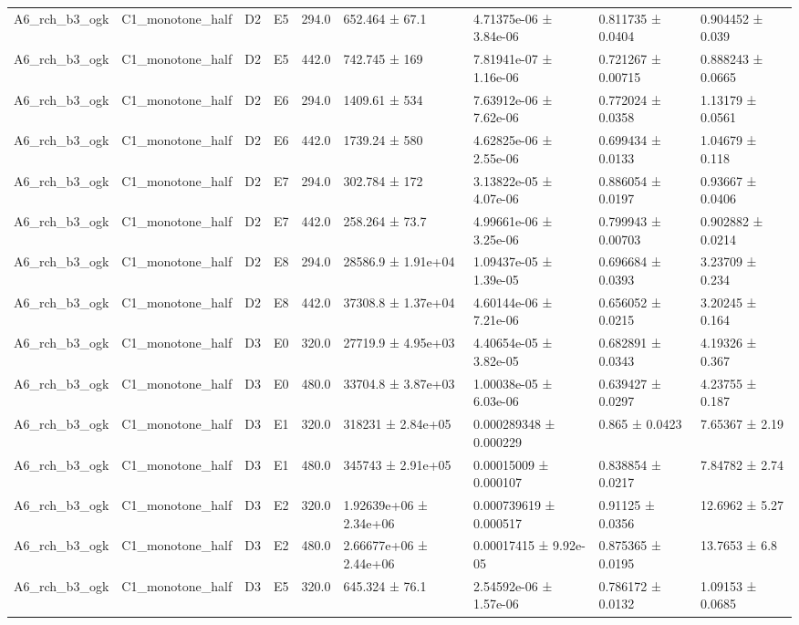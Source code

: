 \begin{table}
\begin{tabular}{lllllllll}
A6\_rch\_b3\_ogk & C1\_monotone\_half & D2 & E5 & 294.0 & 652.464 ± 67.1 & 4.71375e-06 ± 3.84e-06 & 0.811735 ± 0.0404 & 0.904452 ± 0.039 \\
A6\_rch\_b3\_ogk & C1\_monotone\_half & D2 & E5 & 442.0 & 742.745 ± 169 & 7.81941e-07 ± 1.16e-06 & 0.721267 ± 0.00715 & 0.888243 ± 0.0665 \\
A6\_rch\_b3\_ogk & C1\_monotone\_half & D2 & E6 & 294.0 & 1409.61 ± 534 & 7.63912e-06 ± 7.62e-06 & 0.772024 ± 0.0358 & 1.13179 ± 0.0561 \\
A6\_rch\_b3\_ogk & C1\_monotone\_half & D2 & E6 & 442.0 & 1739.24 ± 580 & 4.62825e-06 ± 2.55e-06 & 0.699434 ± 0.0133 & 1.04679 ± 0.118 \\
A6\_rch\_b3\_ogk & C1\_monotone\_half & D2 & E7 & 294.0 & 302.784 ± 172 & 3.13822e-05 ± 4.07e-06 & 0.886054 ± 0.0197 & 0.93667 ± 0.0406 \\
A6\_rch\_b3\_ogk & C1\_monotone\_half & D2 & E7 & 442.0 & 258.264 ± 73.7 & 4.99661e-06 ± 3.25e-06 & 0.799943 ± 0.00703 & 0.902882 ± 0.0214 \\
A6\_rch\_b3\_ogk & C1\_monotone\_half & D2 & E8 & 294.0 & 28586.9 ± 1.91e+04 & 1.09437e-05 ± 1.39e-05 & 0.696684 ± 0.0393 & 3.23709 ± 0.234 \\
A6\_rch\_b3\_ogk & C1\_monotone\_half & D2 & E8 & 442.0 & 37308.8 ± 1.37e+04 & 4.60144e-06 ± 7.21e-06 & 0.656052 ± 0.0215 & 3.20245 ± 0.164 \\
A6\_rch\_b3\_ogk & C1\_monotone\_half & D3 & E0 & 320.0 & 27719.9 ± 4.95e+03 & 4.40654e-05 ± 3.82e-05 & 0.682891 ± 0.0343 & 4.19326 ± 0.367 \\
A6\_rch\_b3\_ogk & C1\_monotone\_half & D3 & E0 & 480.0 & 33704.8 ± 3.87e+03 & 1.00038e-05 ± 6.03e-06 & 0.639427 ± 0.0297 & 4.23755 ± 0.187 \\
A6\_rch\_b3\_ogk & C1\_monotone\_half & D3 & E1 & 320.0 & 318231 ± 2.84e+05 & 0.000289348 ± 0.000229 & 0.865 ± 0.0423 & 7.65367 ± 2.19 \\
A6\_rch\_b3\_ogk & C1\_monotone\_half & D3 & E1 & 480.0 & 345743 ± 2.91e+05 & 0.00015009 ± 0.000107 & 0.838854 ± 0.0217 & 7.84782 ± 2.74 \\
A6\_rch\_b3\_ogk & C1\_monotone\_half & D3 & E2 & 320.0 & 1.92639e+06 ± 2.34e+06 & 0.000739619 ± 0.000517 & 0.91125 ± 0.0356 & 12.6962 ± 5.27 \\
A6\_rch\_b3\_ogk & C1\_monotone\_half & D3 & E2 & 480.0 & 2.66677e+06 ± 2.44e+06 & 0.00017415 ± 9.92e-05 & 0.875365 ± 0.0195 & 13.7653 ± 6.8 \\
A6\_rch\_b3\_ogk & C1\_monotone\_half & D3 & E5 & 320.0 & 645.324 ± 76.1 & 2.54592e-06 ± 1.57e-06 & 0.786172 ± 0.0132 & 1.09153 ± 0.0685 \\

\end{tabular}
\end{table}

